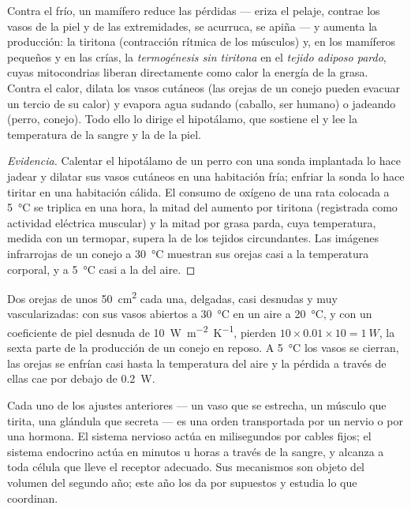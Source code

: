 \begin{proposition}\label{prop:b1:mammal-organization:thermoreg}
Contra el frío, un mamífero reduce las pérdidas --- eriza el pelaje,
contrae los vasos de la piel y de las extremidades, se acurruca, se apiña
--- y aumenta la producción: la tiritona (contracción rítmica de los
músculos) y, en los mamíferos pequeños y en las crías, la
\emph{termogénesis sin tiritona} en el
\emph{tejido adiposo pardo}, cuyas mitocondrias
liberan directamente como calor la energía de la grasa. Contra el calor,
dilata los vasos cutáneos (las orejas de un conejo pueden evacuar un tercio
de su calor) y evapora agua sudando (caballo, ser humano) o jadeando (perro,
conejo). Todo ello lo dirige el hipotálamo, que sostiene el  y lee la temperatura de la sangre y la de la piel.
\end{proposition}
\begin{proof}[Evidencia]
Calentar el hipotálamo de un perro con una sonda implantada lo hace jadear y
dilatar sus vasos cutáneos en una habitación fría; enfriar la sonda lo hace
tiritar en una habitación cálida. El consumo de oxígeno de una rata colocada
a \qty{5}{\celsius} se triplica en una hora, la mitad del aumento por
tiritona (registrada como actividad eléctrica muscular) y la mitad por grasa
parda, cuya temperatura, medida con un termopar, supera la de los tejidos
circundantes. Las imágenes infrarrojas de un conejo a \qty{30}{\celsius}
muestran sus orejas casi a la temperatura corporal, y a \qty{5}{\celsius}
casi a la del aire.
\end{proof}

\begin{example}\label{ex:b1:mammal-organization:ears}
Dos orejas de unos \qty{50}{cm^2} cada una, delgadas, casi desnudas y muy
vascularizadas: con sus vasos abiertos a \qty{30}{\celsius} en un aire a
\qty{20}{\celsius}, y con un coeficiente de piel desnuda de
\qty{10}{W.m^{-2}.K^{-1}}, pierden $10\times 0.01\times 10 =
\qty{1}{W}$, la sexta parte de la producción de un conejo en reposo. A
\qty{5}{\celsius} los vasos se cierran, las orejas se enfrían casi hasta la
temperatura del aire y la pérdida a través de ellas cae por debajo de
\qty{0.2}{W}.
\end{example}

\begin{remark}[Coordinación]\label{rem:b1:mammal-organization:coordination}
Cada uno de los ajustes anteriores --- un vaso que se estrecha, un músculo
que tirita, una glándula que secreta --- es una orden transportada por un
nervio o por una hormona. El sistema nervioso actúa en milisegundos por
cables fijos; el sistema endocrino actúa en minutos u horas a través de la
sangre, y alcanza a toda célula que lleve el receptor adecuado. Sus
mecanismos son objeto del volumen del segundo año; este año los da por
supuestos y estudia lo que coordinan.
\end{remark}

